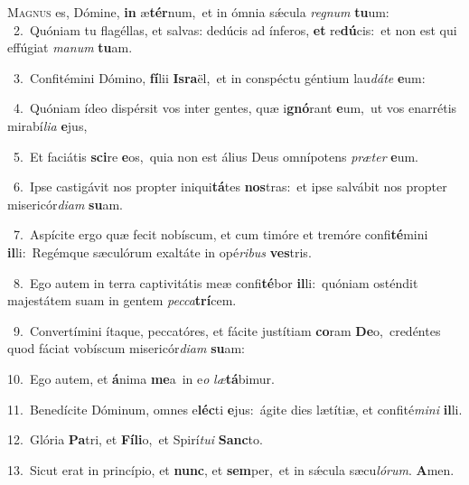 \lettrine{\initial\textcolor{\initialcolor}{M}}{agnus} es, Dómine, \textbf{in} æ\-\textbf{tér}\-num,~\star et in ómnia sǽcula \textit{re}\-\textit{gnum} \textbf{tu}\-um:\\
{\numbfont\textcolor{\numbcolor}{~2.}}~Quóniam tu flagéllas, et salvas: dedúcis ad ínferos, \textbf{et} re\-\textbf{dú}\-cis:~\star et non est qui effúgiat \textit{ma}\-\textit{num} \textbf{tu}\-am.\par
{\numbfont\textcolor{\numbcolor}{~3.}}~Confitémini Dómino, \textbf{fí}\-lii \textbf{Is}\-\textbf{ra}ël,~\star et in conspéctu géntium lau\-\textit{dá}\-\textit{te} \textbf{e}\-um:\par
{\numbfont\textcolor{\numbcolor}{~4.}}~Quóniam ídeo dispérsit vos inter gentes, quæ i\-\textbf{gnó}\-rant \textbf{e}\-um,~\star ut vos enarrétis mirabí\-\textit{li}\-\textit{a} \textbf{e}\-jus,\par
{\numbfont\textcolor{\numbcolor}{~5.}}~Et faciátis \textbf{sci}\-re \textbf{e}\-os,~\star quia non est álius Deus omnípotens \textit{præ}\-\textit{ter} \textbf{e}\-um.\par
{\numbfont\textcolor{\numbcolor}{~6.}}~Ipse castigávit nos propter iniqui\-\textbf{tá}\-tes \textbf{nos}\-tras:~\star et ipse salvábit nos propter misericór\-\textit{di}\-\textit{am} \textbf{su}\-am.\par
{\numbfont\textcolor{\numbcolor}{~7.}}~Aspícite ergo quæ fecit nobíscum, et cum timóre et tremóre confi\-\textbf{té}\-mini \textbf{il}\-li:~\star Regémque sæculórum exaltáte in opé\-\textit{ri}\-\textit{bus} \textbf{ves}\-tris.\par
{\numbfont\textcolor{\numbcolor}{~8.}}~Ego autem in terra captivitátis meæ confi\-\textbf{té}\-bor \textbf{il}\-li:~\star quóniam osténdit majestátem suam in gentem \textit{pec}\-\textit{ca}\textbf{trí}cem.\par
{\numbfont\textcolor{\numbcolor}{~9.}}~Convertímini ítaque, peccatóres, et fácite justítiam \textbf{co}\-ram \textbf{De}\-o,~\star credéntes quod fáciat vobíscum misericór\-\textit{di}\-\textit{am} \textbf{su}\-am:\par
{\numbfont\textcolor{\numbcolor}{10.}}~Ego autem, et \textbf{á}\-nima \textbf{me}\-a~\star in e\textit{o} \textit{læ}\-\textbf{tá}bimur.\par
{\numbfont\textcolor{\numbcolor}{11.}}~Benedícite Dóminum, omnes e\-\textbf{léc}\-ti \textbf{e}\-jus:~\star ágite dies lætítiæ, et confité\-\textit{mi}\-\textit{ni} \textbf{il}\-li.\par
{\numbfont\textcolor{\numbcolor}{12.}}~Glória \textbf{Pa}\-tri, et \textbf{Fí}\-\textbf{li}o,~\star et Spirí\-\textit{tu}\-\textit{i} \textbf{Sanc}\-to.\par
{\numbfont\textcolor{\numbcolor}{13.}}~Sicut erat in princípio, et \textbf{nunc}\-, et \textbf{sem}\-per,~\star et in sǽcula sæcu\-\textit{ló}\-\textit{rum}. \textbf{A}\-men.\par
